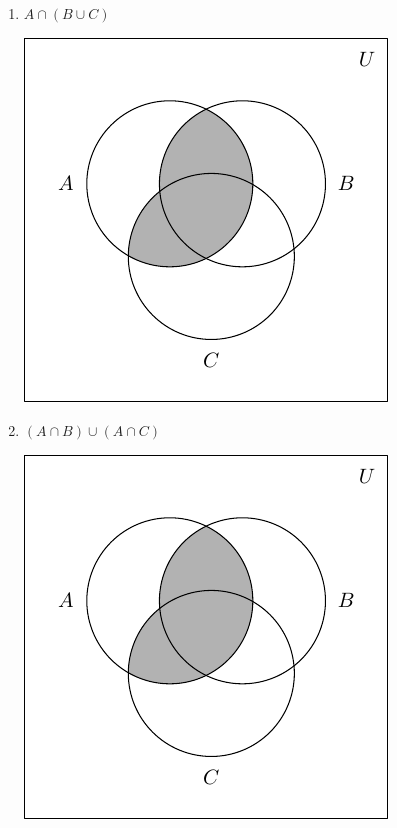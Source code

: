 \documentclass[11pt]{article}
\theoremstyle{definition}  %
\newcounter{HW}
\begin{document}
\begin{multicols}{2}
\begin{enumerate}
\setcounter{enumi}{\value{HW}}


\item $A \cap (B \cup C)$

\includegraphics{SetTheory-44}


\item $(A \cap B) \cup (A \cap C)$ 

\includegraphics{SetTheory-45}




\setcounter{HW}{\value{enumi}}
\end{enumerate}
\end{multicols}
\enlargethispage{2in}
\end{document}
